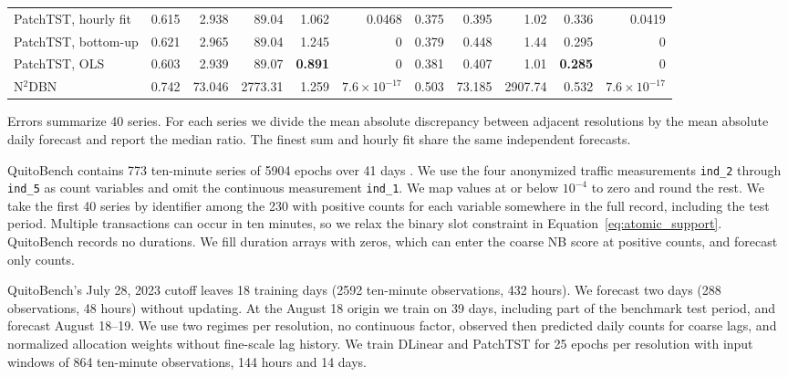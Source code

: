 \documentclass[sigconf]{acmart}
\begin{document}
\begin{table}[t]
\begin{threeparttable}
\begin{tabular}{lrrrrr@{\hspace{1.6em}}rrrrr}
PatchTST, hourly fit & 0.615 & 2.938 & 89.04 & 1.062 & 0.0468 & 0.375 & 0.395 & 1.02 & 0.336 & 0.0419 \\
PatchTST, bottom-up & 0.621 & 2.965 & 89.04 & 1.245 & 0 & 0.379 & 0.448 & 1.44 & 0.295 & 0 \\
PatchTST, OLS & 0.603 & 2.939 & 89.07 & \textbf{0.891} & 0 & 0.381 & 0.407 & 1.01 & \textbf{0.285} & 0 \\
N$^2$DBN & 0.742 & 73.046 & 2773.31 & 1.259 & \(7.6\times10^{-17}\) & 0.503 & 73.185 & 2907.74 & 0.532 & \(7.6\times10^{-17}\) \\
\bottomrule
\end{tabular}
\begin{tablenotes}[flushleft]\footnotesize
\item Errors summarize 40 series. For each series we divide the mean absolute discrepancy between adjacent resolutions by the mean absolute daily forecast and report the median ratio. The finest sum and hourly fit share the same independent forecasts.
\end{tablenotes}
\end{threeparttable}
\end{table}

QuitoBench contains 773 ten-minute series of 5904 epochs over 41 days \citep{xue_quitobench_2026}. We use the four anonymized traffic measurements \texttt{ind\_2} through \texttt{ind\_5} as count variables and omit the continuous measurement \texttt{ind\_1}. We map values at or below \(10^{-4}\) to zero and round the rest. We take the first 40 series by identifier among the 230 with positive counts for each variable somewhere in the full record, including the test period. Multiple transactions can occur in ten minutes, so we relax the binary slot constraint in Equation~\eqref{eq:atomic_support}. QuitoBench records no durations. We fill duration arrays with zeros, which can enter the coarse NB score at positive counts, and forecast only counts.

QuitoBench's July 28, 2023 cutoff leaves 18 training days (2592 ten-minute observations, 432 hours). We forecast two days (288 observations, 48 hours) without updating. At the August 18 origin we train on 39 days, including part of the benchmark test period, and forecast August 18--19. We use two regimes per resolution, no continuous factor, observed then predicted daily counts for coarse lags, and normalized allocation weights without fine-scale lag history. We train DLinear and PatchTST for 25 epochs per resolution with input windows of 864 ten-minute observations, 144 hours and 14 days.
\end{document}
